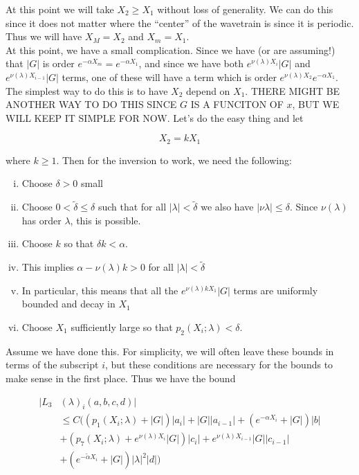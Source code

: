 \documentclass[12pt]{article}
\begin{document}
\begin{enumerate}
At this point we will take $X_2 \geq X_1$ without loss of generality. We can do this since it does not matter where the ``center'' of the wavetrain is since it is periodic. Thus we will have $X_M = X_2$ and $X_m = X_1$. \\

At this point, we have a small complication. Since we have (or are assuming!) that $|G|$ is order $e^{-\alpha X_m} = e^{-\alpha X_1}$, and since we have both $e^{\nu(\lambda)X_i} |G|$ and $e^{\nu(\lambda)X_{i-1}} |G|$ terms, one of these will have a term which is order $e^{\nu(\lambda)X_2} e^{-\alpha X_1}$. The simplest way to do this is to have $X_2$ depend on $X_1$. THERE MIGHT BE ANOTHER WAY TO DO THIS SINCE $G$ IS A FUNCITON OF $x$, BUT WE WILL KEEP IT SIMPLE FOR NOW. Let's do the easy thing and let

\[
X_2 = k X_1
\]

where $k \geq 1$. Then for the inversion to work, we need the following:

\begin{enumerate}[(i)]
\item Choose $\delta > 0$ small
\item Choose $0 < \tilde{\delta} \leq \delta$ such that for all $|\lambda| < \tilde{\delta}$ we also have $|\nu{\lambda}| \leq \delta$. Since $\nu(\lambda)$ has order $\lambda$, this is possible.
\item Choose $k$ so that $\delta k < \alpha$. 
\item This implies $\alpha - \nu(\lambda) k > 0$ for all $|\lambda| < \tilde{\delta}$
\item In particular, this means that all the $e^{\nu(\lambda)k X_1} |G|$ terms are uniformly bounded and decay in $X_1$
\item Choose $X_1$ sufficiently large so that $p_2(X_i; \lambda) < \delta$.
\end{enumerate}

Assume we have done this. For simplicity, we will often leave these bounds in terms of the subscript $i$, but these conditions are necessary for the bounds to make sense in the first place. Thus we have the bound 

\begin{align*}
|L_3&(\lambda)_i(a, b, c, d)| \\
&\leq C \Big( (p_1(X_i; \lambda) + |G|)|a_i| + |G||a_{i-1}| + (e^{-\alpha X_i} + |G|) |b| \\
&+ ( p_7(X_i; \lambda) + e^{\nu(\lambda)X_i} |G|) |c_i| + e^{\nu(\lambda)X_{i-1}} |G| |c_{i-1}| \\
&+ (e^{-\tilde{\alpha} X_i} + |G|) |\lambda|^2 |d| \Big)
\end{align*} 


\end{enumerate}
\end{document}
